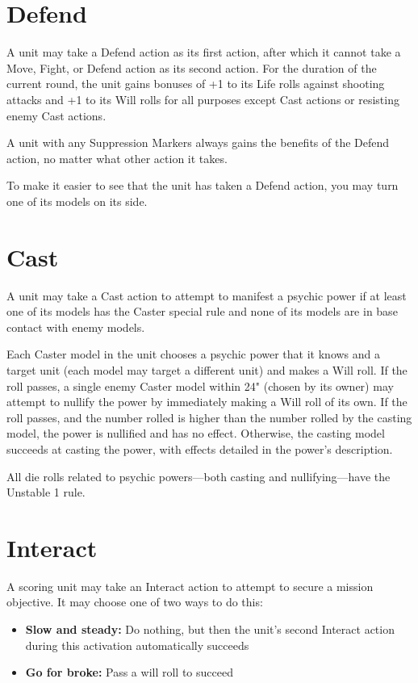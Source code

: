 \begin{multicols}{2}
\section*{Defend}
A unit may take a Defend action as its first action, after which it cannot take a Move, Fight, or Defend action as its second action. For the duration of the current round, the unit gains bonuses of +1 to its Life rolls against shooting attacks and +1 to its Will rolls for all purposes except Cast actions or resisting enemy Cast actions.

A unit with any Suppression Markers always gains the benefits of the Defend action, no matter what other action it takes.

To make it easier to see that the unit has taken a Defend action, you may turn one of its models on its side.




\section*{Cast}
A unit may take a Cast action to attempt to manifest a psychic power if at least one of its models has the Caster special rule and none of its models are in base contact with enemy models.

Each Caster model in the unit chooses a psychic power that it knows and a target unit (each model may target a different unit) and makes a Will roll. If the roll passes, a single enemy Caster model within 24" (chosen by its owner) may attempt to nullify the power by immediately making a Will roll of its own. If the roll passes, and the number rolled is higher than the number rolled by the casting model, the power is nullified and has no effect. Otherwise, the casting model succeeds at casting the power, with effects detailed in the power's description.

All die rolls related to psychic powers—both casting and nullifying—have the Unstable 1 rule.




\section*{Interact}
A scoring unit may take an Interact action to attempt to secure a mission objective. It may choose one of two ways to do this:
\begin{itemize}
    \item \textbf{Slow and steady:} Do nothing, but then the unit's second Interact action during this activation automatically succeeds
    \item \textbf{Go for broke:} Pass a will roll to succeed
\end{itemize}


\end{multicols}
